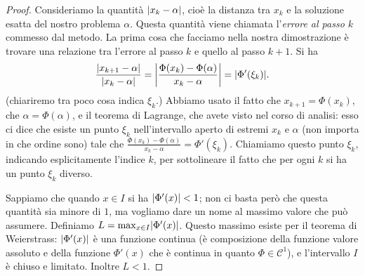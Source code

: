 \documentclass[a4paper]{report}
\DeclarePairedDelimiter{\abs}{\lvert}{\rvert}
\theoremstyle{definiton}
\theoremstyle{remark}
\begin{document}
\begin{proof}
Consideriamo la quantità $\abs{x_k-\alpha}$, cioè la distanza tra $x_k$ e la soluzione esatta del nostro problema $\alpha$. Questa quantità viene chiamata l'\emph{errore al passo $k$} commesso dal metodo. La prima cosa che facciamo nella nostra dimostrazione è trovare una relazione tra l'errore al passo $k$ e quello al passo $k+1$. Si ha
\[
\frac{\abs{x_{k+1}-\alpha}}{\abs{x_k-\alpha}} = \abs*{
    \frac{\Phi(x_k)-\Phi(\alpha)}{x_k-\alpha}} = \abs{\Phi'(\xi_k)}.
\]
(chiariremo tra poco cosa indica $\xi_k$.) Abbiamo usato il fatto che $x_{k+1} = \Phi(x_k)$, che $\alpha = \Phi(\alpha)$, e il teorema di Lagrange, che avete visto nel corso di analisi: esso ci dice che esiste un punto $\xi_k$ nell'intervallo aperto di estremi $x_k$ e $\alpha$ (non importa in che ordine sono) tale che $\frac{\Phi(x_k)-\Phi(\alpha)}{x_k-\alpha} = \Phi'(\xi_k)$. Chiamiamo questo punto $\xi_k$, indicando esplicitamente l'indice $k$, per sottolineare il fatto che per ogni $k$ si ha un punto $\xi_k$ diverso.

Sappiamo che quando $x\in I$ si ha $\abs{\Phi'(x)}<1$; non ci basta però che questa quantità sia minore di $1$, ma vogliamo dare un nome al massimo valore che può assumere. Definiamo $L = \max_{x\in I} \abs{\Phi'(x)}$. Questo massimo esiste per il teorema di Weierstrass: $\abs{\Phi'(x)}$ è una funzione continua (è composizione della funzione valore assoluto e della funzione $\Phi'(x)$ che è continua in quanto $\Phi \in \mathcal{C}^1$), e l'intervallo $I$ è chiuso e limitato. Inoltre $L<1$.


\end{proof}
\end{document}
